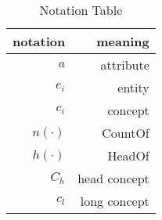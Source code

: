 \begin{table}[htbp]
  \centering
  \caption{Notation Table}
    \begin{tabular}{rr}
    \toprule
    notation & meaning \\
    \midrule
    $a$     & attribute \\
    $e_i$  & entity \\
    $c_i$  & concept \\
    $n(\cdot)$  & CountOf \\
    $h(\cdot)$ & HeadOf \\
    $C_h$  & head concept \\
    $c_l$  & long concept \\
    \bottomrule
    \end{tabular}%
  \label{tab:notation}%
\end{table}%


%
%
%
%
%
%
%
%
%
%
%
%
%

